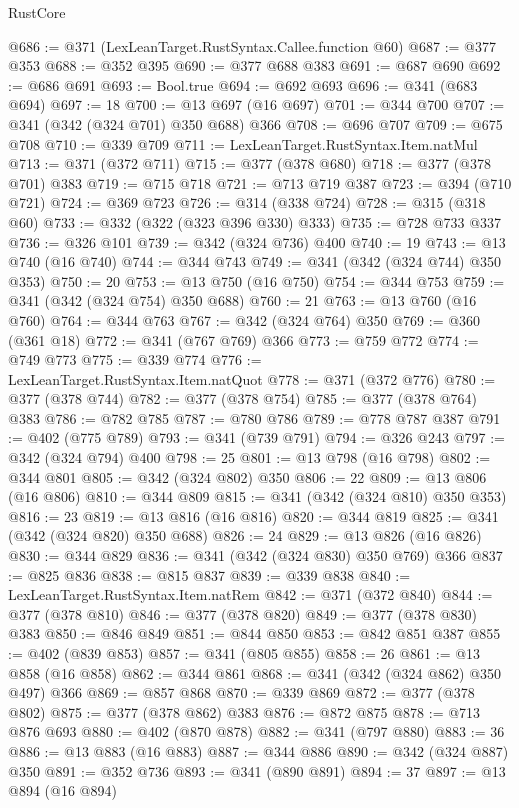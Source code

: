 \begin{lexlean}{RustCore}
\begin{coremodule}
@686 := @371 (LexLeanTarget.RustSyntax.Callee.function @60)
@687 := @377 @353
@688 := @352 @395
@690 := @377 @688 @383
@691 := @687 @690
@692 := @686 @691
@693 := Bool.true
@694 := @692 @693
@696 := @341 (@683 @694)
@697 := 18
@700 := @13 @697 (@16 @697)
@701 := @344 @700
@707 := @341 (@342 (@324 @701) @350 @688) @366
@708 := @696 @707
@709 := @675 @708
@710 := @339 @709
@711 := LexLeanTarget.RustSyntax.Item.natMul
@713 := @371 (@372 @711)
@715 := @377 (@378 @680)
@718 := @377 (@378 @701) @383
@719 := @715 @718
@721 := @713 @719 @387
@723 := @394 (@710 @721)
@724 := @369 @723
@726 := @314 (@338 @724)
@728 := @315 (@318 @60)
@733 := @332 (@322 (@323 @396 @330) @333)
@735 := @728 @733 @337
@736 := @326 @101
@739 := @342 (@324 @736) @400
@740 := 19
@743 := @13 @740 (@16 @740)
@744 := @344 @743
@749 := @341 (@342 (@324 @744) @350 @353)
@750 := 20
@753 := @13 @750 (@16 @750)
@754 := @344 @753
@759 := @341 (@342 (@324 @754) @350 @688)
@760 := 21
@763 := @13 @760 (@16 @760)
@764 := @344 @763
@767 := @342 (@324 @764) @350
@769 := @360 (@361 @18)
@772 := @341 (@767 @769) @366
@773 := @759 @772
@774 := @749 @773
@775 := @339 @774
@776 := LexLeanTarget.RustSyntax.Item.natQuot
@778 := @371 (@372 @776)
@780 := @377 (@378 @744)
@782 := @377 (@378 @754)
@785 := @377 (@378 @764) @383
@786 := @782 @785
@787 := @780 @786
@789 := @778 @787 @387
@791 := @402 (@775 @789)
@793 := @341 (@739 @791)
@794 := @326 @243
@797 := @342 (@324 @794) @400
@798 := 25
@801 := @13 @798 (@16 @798)
@802 := @344 @801
@805 := @342 (@324 @802) @350
@806 := 22
@809 := @13 @806 (@16 @806)
@810 := @344 @809
@815 := @341 (@342 (@324 @810) @350 @353)
@816 := 23
@819 := @13 @816 (@16 @816)
@820 := @344 @819
@825 := @341 (@342 (@324 @820) @350 @688)
@826 := 24
@829 := @13 @826 (@16 @826)
@830 := @344 @829
@836 := @341 (@342 (@324 @830) @350 @769) @366
@837 := @825 @836
@838 := @815 @837
@839 := @339 @838
@840 := LexLeanTarget.RustSyntax.Item.natRem
@842 := @371 (@372 @840)
@844 := @377 (@378 @810)
@846 := @377 (@378 @820)
@849 := @377 (@378 @830) @383
@850 := @846 @849
@851 := @844 @850
@853 := @842 @851 @387
@855 := @402 (@839 @853)
@857 := @341 (@805 @855)
@858 := 26
@861 := @13 @858 (@16 @858)
@862 := @344 @861
@868 := @341 (@342 (@324 @862) @350 @497) @366
@869 := @857 @868
@870 := @339 @869
@872 := @377 (@378 @802)
@875 := @377 (@378 @862) @383
@876 := @872 @875
@878 := @713 @876 @693
@880 := @402 (@870 @878)
@882 := @341 (@797 @880)
@883 := 36
@886 := @13 @883 (@16 @883)
@887 := @344 @886
@890 := @342 (@324 @887) @350
@891 := @352 @736
@893 := @341 (@890 @891)
@894 := 37
@897 := @13 @894 (@16 @894)

\end{coremodule}
\end{lexlean}
